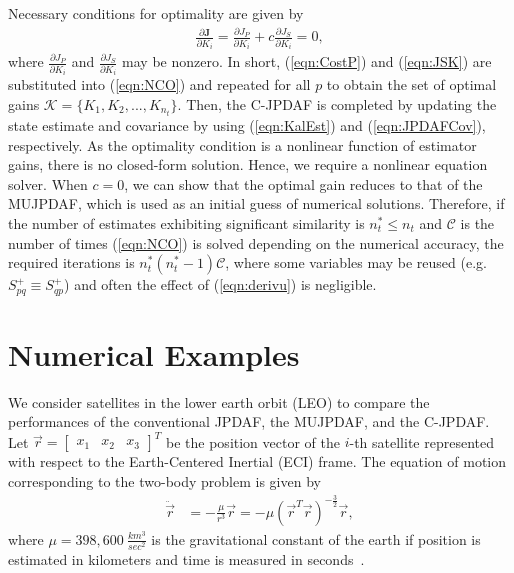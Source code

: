 \documentclass[letterpaper, 10pt, conference]{ieeeconf}
\newcommand{\refeqn}[1]{(\ref{eqn:#1})}
\newcommand{\deriv}[2]{\ensuremath{\frac{\partial #1}{\partial #2}}}
\begin{document}
Necessary conditions for optimality are given by
\begin{align}
\deriv{\mathbf{J}}{K_i} = \deriv{J_P}{K_i} + c \deriv{J_S}{K_i} =0,\label{eqn:NCO}
\end{align}
where $\deriv{J_P}{K_i}$ and $\deriv{J_S}{K_i}$ may be nonzero.
In short, \refeqn{CostP} and \refeqn{JSK} are substituted into \refeqn{NCO} and repeated for all $p$ to obtain the set of optimal gains $\mathcal{K}=\{K_1,K_2,...,K_{n_t}\}$.
Then, the C-JPDAF is completed by updating the state estimate and covariance by using \refeqn{KalEst} and \refeqn{JPDAFCov}, respectively.
As the optimality condition is a nonlinear function of estimator gains, there is no closed-form solution.
Hence, we require a nonlinear equation solver.
When $c=0$, we can show that the optimal gain reduces to that of the MUJPDAF, which is used as an initial guess of numerical solutions.
Therefore, if the number of estimates exhibiting significant similarity is $n_t^*\leq n_t$ and $\mathcal C$ is the number of times \refeqn{NCO} is solved depending on the numerical accuracy, the required iterations is $n_t^*(n_t^*-1)\mathcal C$, where some variables may be reused (e.g. $S^+_{pq}\equiv S^+_{qp}$) and often the effect of \refeqn{derivu} is negligible.






\section{Numerical Examples}
\label{NumRes}


We consider satellites in the lower earth orbit (LEO) to compare the performances of the conventional JPDAF, the MUJPDAF, and the C-JPDAF.
Let $\vec r=\begin{bmatrix}x_1 & x_2 & x_3\end{bmatrix}^T$ be the position vector of the $i$-th satellite represented with respect to the Earth-Centered Inertial (ECI) frame.
The equation of motion corresponding to the two-body problem is given by
\begin{align}
\ddot{\vec r}&=-\frac{\mu}{r^3}\vec r=-\mu(\vec r^T\vec r)^{-\frac32}\vec r,
\end{align}
where $\mu=398,600\ \frac{km^3}{sec^2}$ is the gravitational constant of the earth if position is estimated in kilometers and time is measured in seconds~\cite{Val01}.
\end{document}
